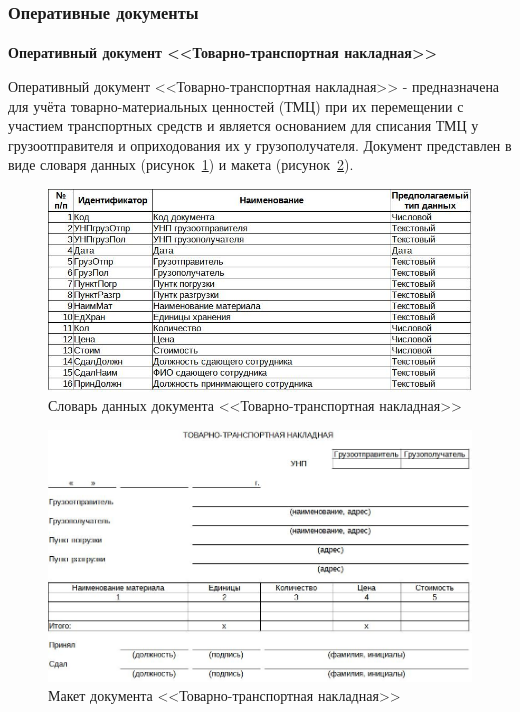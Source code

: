 \documentclass[12pt, a4paper, simple]{eskdtext}
\begin{document}
    \newpage

    \subsubsection{Оперативные документы}

    \paragraph{} \textbf{Оперативный документ <<Товарно-транспортная накладная>>}

    Оперативный документ <<Товарно-транспортная накладная>> - предназначена для учёта
    товарно-материальных ценностей (ТМЦ) при их перемещении с участием транспортных средств
    и является основанием для списания ТМЦ у грузоотправителя и оприходования их у грузополучателя.
    Документ представлен в виде словаря данных (рисунок~\ref{fig:OP_TTH_tipi})
    и макета (рисунок~\ref{fig:OP_TTH_maket}).

    \begin{figure}[!h]
        \centering
        \includegraphics[width=14cm]
            {_docs/ОП_ТТН_типы.jpg}
        \caption{Словарь данных документа <<Товарно-транспортная накладная>>}
        \label{fig:OP_TTH_tipi}
    \end{figure}

    \begin{figure}[!h]
        \centering
        \includegraphics[width=14cm]
            {_docs/ОП_ТТН_макет.jpg}
        \caption{Макет документа <<Товарно-транспортная накладная>>}
        \label{fig:OP_TTH_maket}
    \end{figure}
\end{document}
